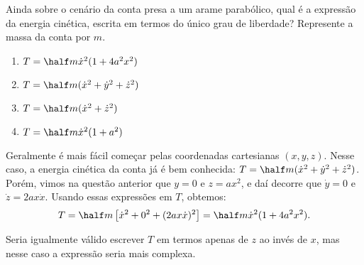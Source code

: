 \begin{question}
    Ainda sobre o cenário da conta presa a um arame parabólico, qual é a expressão da energia cinética, escrita em termos do único grau de liberdade?
    Represente a massa da conta por $m$.
    \begin{enumerate}
      \item $T = \half m \dot x^2 (1 + 4a^2 x^2)$ \rightanswer
      \item $T = \half m (\dot x^2 + \dot y^2 + \dot z^2)$
      \item $T = \half m (\dot x^2 + \dot z^2)$
      \item $T = \half m \dot x^2 (1 + a^2)$
    \end{enumerate}

    \begin{solution}
      Geralmente é mais fácil começar pelas coordenadas cartesianas $(x,y,z)$.
      Nesse caso, a energia cinética da conta já é bem conhecida: $T = \half m (\dot x^2 + \dot y^2 + \dot z^2)$.
      Porém, vimos na questão anterior que $y = 0$ e $z = ax^2$, e daí decorre que $\dot y = 0$ e $\dot z = 2ax \dot x$.
      Usando essas expressões em $T$, obtemos:
      \begin{equation*}
        T = \half m \left[\dot x^2 + 0^2 + (2ax\dot x)^2\right] =  \half m \dot x^2 (1 + 4a^2 x^2).
      \end{equation*}

      Seria igualmente válido escrever $T$ em termos apenas de $z$ ao invés de $x$, mas nesse caso a expressão seria mais complexa.
    \end{solution}
\end{question}